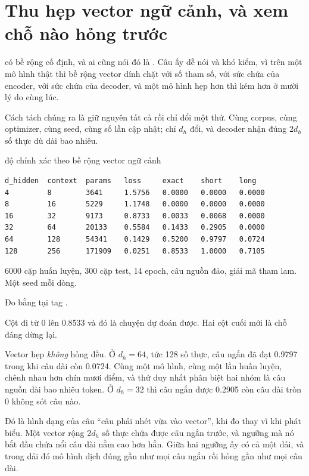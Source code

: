 \section{Thu hẹp vector ngữ cảnh, và xem chỗ nào hỏng trước}
\label{sec:ch05-bop-vector}

%
 có bề rộng cố định, và ai cũng nói đó là
. Câu ấy dễ nói và khó kiểm, vì trên một mô hình thật thì bề rộng
vector dính chặt với số tham số, với sức chứa của encoder, với sức chứa của
decoder, và một mô hình hẹp hơn thì kém hơn ở mười lý do cùng lúc.

Cách tách chúng ra là giữ nguyên tất cả rồi chỉ đổi một thứ. Cùng corpus, cùng
optimizer, cùng seed, cùng số lần cập nhật; chỉ \(d_h\) đổi, và decoder nhận
đúng \(2 d_h\) số thực dù  dài bao nhiêu.

\begin{measured}{độ chính xác theo bề rộng vector ngữ cảnh}
\begin{verbatim}
d_hidden  context  params   loss     exact    short    long
4         8        3641     1.5756   0.0000   0.0000   0.0000
8         16       5229     1.1748   0.0000   0.0000   0.0000
16        32       9173     0.8733   0.0033   0.0068   0.0000
32        64       20133    0.5584   0.1433   0.2905   0.0000
64        128      54341    0.1429   0.5200   0.9797   0.0724
128       256      171909   0.0251   0.8533   1.0000   0.7105
\end{verbatim}

6000 cặp huấn luyện, 300 cặp test, 14 epoch, câu nguồn đảo, giải mã tham lam.
Một seed mỗi dòng.

Đo bằng  tại tag .
\end{measured}

%
Cột  đi từ 0 lên 0.8533 và đó là chuyện dự đoán được. Hai cột cuối
mới là chỗ đáng dừng lại.

Vector hẹp \emph{không} hỏng đều. Ở \(d_h = 64\), tức 128 số thực, câu ngắn đã
đạt 0.9797 trong khi câu dài còn 0.0724. Cùng một mô hình, cùng một lần huấn
luyện, chênh nhau hơn chín mươi điểm, và thứ duy nhất phân biệt hai nhóm là câu
nguồn dài bao nhiêu token. Ở \(d_h = 32\) thì câu ngắn được 0.2905 còn câu dài
tròn 0 không sót câu nào.

Đó là hình dạng của câu \enquote{câu phải nhét vừa vào vector}, khi đo thay vì
khi phát biểu. Một vector rộng \(2 d_h\) số thực chứa được câu ngắn trước, và
ngưỡng mà nó bắt đầu chứa nổi câu dài nằm cao hơn hẳn. Giữa hai ngưỡng ấy có cả
một dải, và trong dải đó mô hình dịch đúng gần như mọi câu ngắn rồi hỏng gần như
mọi câu dài.

